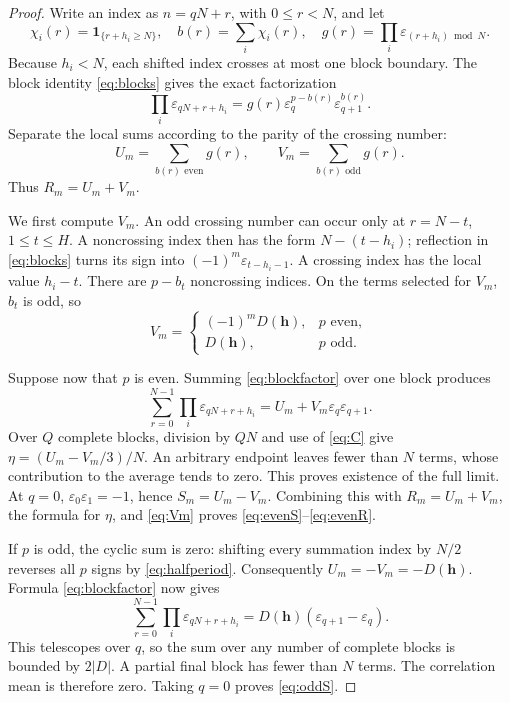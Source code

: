 \documentclass[11pt,oneside]{article}
\numberwithin{equation}{section}
\theoremstyle{definition}
\theoremstyle{remark}
\newcommand{\eps}{\varepsilon}
\begin{document}
\begin{proof}
Write an index as \(n=qN+r\), with \(0\le r<N\), and let
\[
 \chi_i(r)=\boldsymbol 1_{\{r+h_i\ge N\}},\quad
 b(r)=\sum_i\chi_i(r),\quad
 g(r)=\prod_i\eps_{(r+h_i)\bmod N}.
\]
Because \(h_i<N\), each shifted index crosses at most one block boundary.
The block identity \eqref{eq:blocks} gives the exact factorization
\begin{equation}
 \prod_i\eps_{qN+r+h_i}
   =g(r)\eps_q^{p-b(r)}\eps_{q+1}^{b(r)}.
 \label{eq:blockfactor}
\end{equation}
Separate the local sums according to the parity of the crossing number:
\[
 U_m=\sum_{b(r)\text{ even}}g(r),\qquad
 V_m=\sum_{b(r)\text{ odd}}g(r).
\]
Thus \(R_m=U_m+V_m\).

We first compute \(V_m\). An odd crossing number can occur only at
\(r=N-t\), \(1\le t\le H\). A noncrossing index then has the form
\(N-(t-h_i)\); reflection in \eqref{eq:blocks} turns its sign into
\((-1)^m\eps_{t-h_i-1}\). A crossing index has the local value \(h_i-t\).
There are \(p-b_t\) noncrossing indices. On the terms selected for \(V_m\),
\(b_t\) is odd, so
\begin{equation}
 V_m=
 \begin{cases}
  (-1)^mD(\bm h),&p\text{ even},\\
  D(\bm h),&p\text{ odd}.
 \end{cases}
 \label{eq:Vm}
\end{equation}

Suppose now that \(p\) is even. Summing \eqref{eq:blockfactor} over one block
produces
\begin{equation}
 \sum_{r=0}^{N-1}\prod_i\eps_{qN+r+h_i}
       =U_m+V_m\eps_q\eps_{q+1}.
 \label{eq:evenblock}
\end{equation}
Over \(Q\) complete blocks, division by \(QN\) and use of \eqref{eq:C} give
\(\eta=(U_m-V_m/3)/N\). An arbitrary endpoint leaves fewer than \(N\) terms,
whose contribution to the average tends to zero. This proves existence of the
full limit. At \(q=0\), \(\eps_0\eps_1=-1\), hence \(S_m=U_m-V_m\). Combining
this with \(R_m=U_m+V_m\), the formula for \(\eta\), and \eqref{eq:Vm} proves
\eqref{eq:evenS}--\eqref{eq:evenR}.

If \(p\) is odd, the cyclic sum is zero: shifting every summation index by
\(N/2\) reverses all \(p\) signs by \eqref{eq:halfperiod}. Consequently
\(U_m=-V_m=-D(\bm h)\). Formula \eqref{eq:blockfactor} now gives
\begin{equation}
 \sum_{r=0}^{N-1}\prod_i\eps_{qN+r+h_i}
       =D(\bm h)(\eps_{q+1}-\eps_q).
 \label{eq:oddblock}
\end{equation}
This telescopes over \(q\), so the sum over any number of complete blocks is
bounded by \(2|D|\). A partial final block has fewer than \(N\) terms.
The correlation mean is therefore zero. Taking \(q=0\) proves
\eqref{eq:oddS}.
\end{proof}
\end{document}
